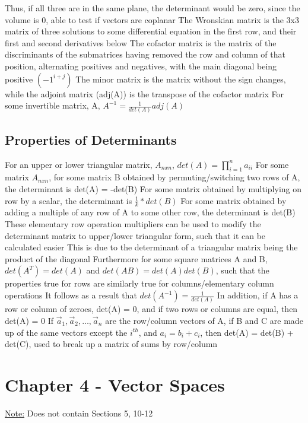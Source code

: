\documentclass[11 pt, twoside]{article}
\newenvironment{outline*}
{
	\begin{outline}[enumerate]
	}
	{\end{outline}
}
\begin{document}
\begin{outline*}
\4 Thus, if all three are in the same plane, the determinant would be zero, since the volume is 0, able to test if vectors are coplanar
\1 The Wronskian matrix is the 3x3 matrix of three solutions to some differential equation in the first row, and their first and second derivatives below
\1 The cofactor matrix is the matrix of the discriminants of the submatrices having removed the row and column of that position, alternating positives and negatives, with the main diagonal being positive $(-1^{i + j})$
\2 The minor matrix is the matrix without the sign changes, while the adjoint matrix (adj(A)) is the transpose of the cofactor matrix
\2 For some invertible matrix, A, $A^{-1} = \frac{1}{det(A)}adj(A)$
\end{outline*}
\subsection{Properties of Determinants}
\begin{outline*}
\1 For an upper or lower triangular matrix, $A_{nxn}$, $det(A) = \prod_{i = 1}^n a_{ii}$
\1 For some matrix $A_{nxn}$, for some matrix B obtained by permuting/switching two rows of A, the determinant is det(A) = -det(B)
\2 For some matrix obtained by multiplying on row by a scalar, the determinant is $\frac{1}{k}*det(B)$
\2 For some matrix obtained by adding a multiple of any row of A to some other row, the determinant is det(B)
\1 These elementary row operation multipliers can be used to modify the determinant matrix to upper/lower triangular form, such that it can be calculated easier
\2 This is due to the determinant of a triangular matrix being the product of the diagonal
\1 Furthermore for some square matrices A and B, $det(A^T) = det(A)$ and $det(AB) = det(A)det(B)$, such that the properties true for rows are similarly true for columns/elementary column operations
\2 It follows as a result that $det(A^{-1}) = \frac{1}{det(A)}$
\2 In addition, if A has a row or column of zeroes, det(A) = 0, and if two rows or columns are equal, then det(A) = 0
\2 If $\vec{a}_1, \vec{a}_2, \dots, \vec{a}_n$ are the row/column vectors of A, if B and C are made up of the same vectors except the $i^{th}$, and $a_i = b_i + c_i$, then det(A) = det(B) + det(C), used to break up a matrix of sums by row/column
\end{outline*}
\section{Chapter 4 - Vector Spaces}
\underline{Note:} Does not contain Sections 5, 10-12
\end{document}
